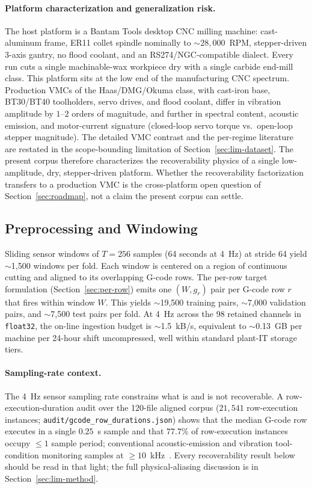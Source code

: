 \documentclass[sensors,article,submit,moreauthors,pdftex]{Definitions/mdpi}
\begin{document}
\paragraph{Platform characterization and generalization risk.} The host platform is a Bantam Tools desktop CNC milling machine: cast-aluminum frame, ER11 collet spindle nominally to $\sim 28{,}000$~RPM, stepper-driven 3-axis gantry, no flood coolant, and an RS274/NGC-compatible dialect. Every run cuts a single machinable-wax workpiece dry with a single carbide end-mill class. This platform sits at the low end of the manufacturing CNC spectrum. Production VMCs of the Haas/DMG/Okuma class, with cast-iron base, BT30/BT40 toolholders, servo drives, and flood coolant, differ in vibration amplitude by $1$--$2$ orders of magnitude, and further in spectral content, acoustic emission, and motor-current signature (closed-loop servo torque vs.\ open-loop stepper magnitude). The detailed VMC contrast and the per-regime literature~\cite{teti2010advanced,wang2018deep,serin2020tool} are restated in the scope-bounding limitation of Section~\ref{sec:lim-dataset}. The present corpus therefore characterizes the recoverability physics of a single low-amplitude, dry, stepper-driven platform. Whether the recoverability factorization transfers to a production VMC is the cross-platform open question of Section~\ref{sec:roadmap}, not a claim the present corpus can settle.

\subsection{Preprocessing and Windowing}
\label{sec:preprocessing}

Sliding sensor windows of $T=256$ samples (64 seconds at 4~Hz) at stride 64 yield $\sim$1{,}500 windows per fold. Each window is centered on a region of continuous cutting and aligned to its overlapping G-code rows. The per-row target formulation (Section~\ref{sec:per-row}) emits one $(W, g_r)$ pair per G-code row $r$ that fires within window $W$. This yields $\sim$19{,}500 training pairs, $\sim$7{,}000 validation pairs, and $\sim$7{,}500 test pairs per fold. At 4~Hz across the 98 retained channels in \texttt{float32}, the on-line ingestion budget is $\sim$1.5~kB/s, equivalent to $\sim$0.13~GB per machine per 24-hour shift uncompressed, well within standard plant-IT storage tiers.

\paragraph{Sampling-rate context.} The 4~Hz sensor sampling rate constrains what is and is not recoverable. A row-execution-duration audit over the 120-file aligned corpus ($21{,}541$ row-execution instances; \texttt{audit/gcode\_row\_durations.json}) shows that the median G-code row executes in a single $0.25$~s sample and that $77.7\%$ of row-execution instances occupy $\le\!1$ sample period; conventional acoustic-emission and vibration tool-condition monitoring samples at $\geq\!10$~kHz~\cite{teti2010advanced}. Every recoverability result below should be read in that light; the full physical-aliasing discussion is in Section~\ref{sec:lim-method}.
\end{document}
